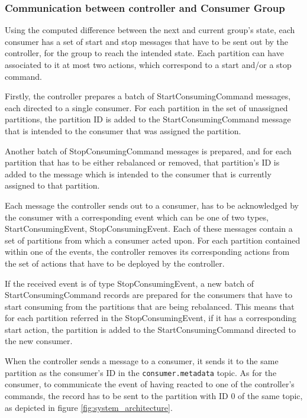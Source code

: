 \subsubsection{Communication between controller and Consumer Group}
\label{sub:controller_communication_cosumer}

Using the computed difference between the next and current group's state, each
consumer has a set of start and stop messages that have to be sent out by the
controller, for the group to reach the intended state. Each partition can have
associated to it at most two actions, which correspond to a start and/or a stop
command. 

Firstly, the controller prepares a batch of StartConsumingCommand messages, each
directed to a single consumer. For each partition in the set of unassigned
partitions, the partition ID is added to the StartConsumingCommand message that
is intended to the consumer that was assigned the partition.

Another batch of StopConsumingCommand messages is prepared, and for each
partition that has to be either rebalanced or removed, that partition's ID is
added to the message which is intended to the consumer that is currently
assigned to that partition. 

Each message the controller sends out to a consumer, has to be acknowledged by
the consumer with a corresponding event which can be one of two types,
StartConsumingEvent, StopConsumingEvent. Each of these messages contain a set of
partitions from which a consumer acted upon. For each partition contained within
one of the events, the controller removes its corresponding actions from the set
of actions that have to be deployed by the controller. 

If the received event is of type StopConsumingEvent, a new batch of
StartConsumingCommand records are prepared for the consumers that have to start
consuming from the partitions that are being rebalanced. This means that for
each partition referred in the StopConsumingEvent, if it has a corresponding
start action, the partition is added to the StartConsumingCommand directed to
the new consumer. 

When the controller sends a message to a consumer, it sends it to the same
partition as the consumer's ID in the \lstinline{consumer.metadata} topic. As for
the consumer, to communicate the event of having reacted to one of the
controller's commands, the record has to be sent to the partition with ID $0$ of
the same topic, as depicted in figure \ref{fig:system_architecture}.

